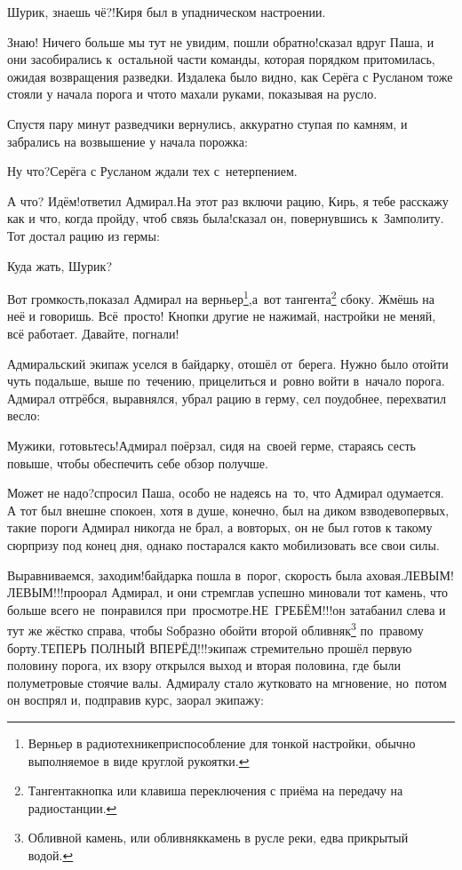 \diagdash Шурик, знаешь чё?!\mdash Киря был в упадническом настроении.

\diagdash Знаю! Ничего больше мы тут не увидим, пошли обратно!\mdash сказал вдруг Паша, и они засобирались к~остальной части команды, которая порядком притомилась, ожидая возвращения разведки. Издалека было видно, как Серёга с Русланом тоже стояли у начала порога и что\sdash то махали руками, показывая на русло.

Спустя пару минут разведчики вернулись, аккуратно ступая по камням, и забрались на возвышение у начала порожка:

\diagdash Ну что?\mdash Серёга с Русланом ждали тех с~нетерпением.

\diagdash А что? Идём!\mdash ответил Адмирал.\mdash На этот раз включи рацию, Кирь, я тебе расскажу как и что, когда пройду, чтоб связь была!\mdash сказал он, повернувшись к~Замполиту. Тот достал рацию из гермы:

\diagdash Куда жать, Шурик?

\renewcommand*{\thefootnote}{\arabic{footnote}}
\setcounter{footnote}{0}
\diagdash Вот громкость,\mdash показал Адмирал на верньер\footnote{Верньер в радиотехнике\mdash приспособление для тонкой настройки, обычно выполняемое в виде круглой рукоятки.},\mdash а~вот тангента\footnote{Тангента\mdash кнопка или клавиша переключения с приёма на передачу на радиостанции.} сбоку. Жмёшь на неё и говоришь. Всё~просто! Кнопки другие не нажимай, настройки не меняй, всё работает. Давайте, погнали!

Адмиральский экипаж уселся в байдарку, отошёл от~берега. Нужно было отойти чуть подальше, выше по~течению, прицелиться и~ровно войти в~начало порога. Адмирал отгрёбся, выравнялся, убрал рацию в герму, сел поудобнее, перехватил весло: 

\diagdash Мужики, готовьтесь!\mdash Адмирал поёрзал, сидя на~своей герме, стараясь сесть повыше, чтобы обеспечить себе обзор получше.

\diagdash Может не надо?\mdash спросил Паша, особо не надеясь на~то, что Адмирал одумается. А тот был внешне спокоен, хотя в душе, конечно, был на диком взводе\mdash во\sdash первых, такие пороги Адмирал никогда не брал, а во\sdash вторых, он не был готов к такому сюрпризу под конец дня, однако постарался как\sdash то мобилизовать все свои силы.

\renewcommand*{\thefootnote}{\fnsymbol{footnote}}
\setcounter{footnote}{0}
\diagdash Выравниваемся, заходим!\mdash байдарка пошла в~порог, скорость была аховая.\mdash ЛЕВЫМ! ЛЕВЫМ!!!\mdash проорал Адмирал, и они стремглав успешно миновали тот камень, что больше всего не~понравился при~просмотре.\mdash НЕ~ГРЕБЁМ!!!\mdash он затабанил слева и тут же жёстко справа, чтобы S\sdash образно обойти второй обливняк\footnote{Обливной камень, или обливняк\mdash камень в русле реки, едва прикрытый водой.} по~правому борту.\mdash ТЕПЕРЬ ПОЛНЫЙ ВПЕРЁД!!!\mdash экипаж стремительно прошёл первую половину порога, их взору открылся выход и вторая половина, где были полуметровые стоячие валы. Адмиралу стало жутковато на мгновение, но~потом он воспрял и, подправив курс, заорал экипажу:

